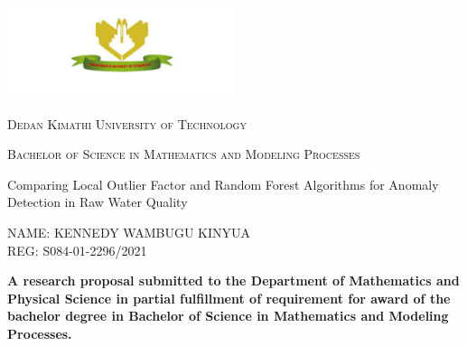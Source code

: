 \begin{titlepage}

	\centering
			\includegraphics[width=0.5\textwidth]{dekut.png}
		
		\vspace{1cm}
		{\scshape\LARGE Dedan Kimathi University of Technology\par}
		\vspace{1cm}
		{\scshape\Large Bachelor of Science in Mathematics and Modeling Processes\par}
		\vspace{1.5cm}
		{\huge Comparing Local Outlier Factor and Random Forest Algorithms for Anomaly Detection in Raw Water Quality\par}
		\vspace{1cm}
		{\large NAME: KENNEDY WAMBUGU KINYUA\\REG: S084-01-2296/2021\par}
		\vfill
		\large \textbf{A research proposal submitted to the Department of Mathematics and Physical Science in partial fulfillment of requirement for award of the bachelor degree in Bachelor of Science in  Mathematics and Modeling Processes.}
\end{titlepage}
